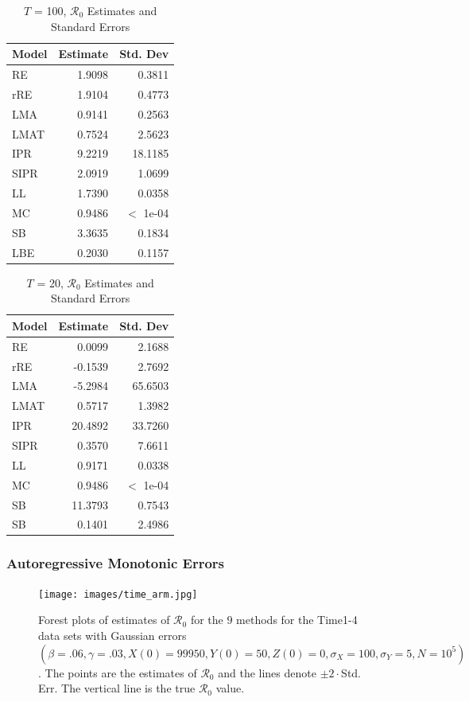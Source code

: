 \documentclass[12pt]{article}
\newcommand{\xxsir}{\ensuremath{9} } %
\newcommand{\rr}{\ensuremath{\mathcal{R}_0}}
\begin{document}
\begin{table}[H]
	
	
	\centering
	\begin{tabular}[t]{l|r|r}
		\hline
		Model & Estimate & Std. Dev\\
		\hline
		RE & 1.9098 & 0.3811\\
		\hline
		rRE & 1.9104 & 0.4773\\
		\hline
		LMA & 0.9141 & 0.2563\\
		\hline
		LMAT & 0.7524 & 2.5623\\
		\hline
		IPR & 9.2219 & 18.1185\\
		\hline
		SIPR & 2.0919 & 1.0699\\
		\hline
		LL & 1.7390 & 0.0358\\
		\hline
		MC & 0.9486 & $<$ 1e-04\\
		\hline
		SB & 3.3635 & 0.1834\\
		\hline
		LBE & 0.2030 & 0.1157\\
		\hline
	\end{tabular}
	\caption{ $T$ = 100, $\rr$ Estimates and Standard Errors}
\end{table}

\begin{table}[H]
	\centering
	\begin{tabular}[t]{l|r|r}
		\hline
		Model & Estimate & Std. Dev\\
		\hline
		RE & 0.0099 & 2.1688\\
		\hline
		rRE & -0.1539 & 2.7692\\
		\hline
		LMA & -5.2984 & 65.6503\\
		\hline
		LMAT & 0.5717 & 1.3982\\
		\hline
		IPR & 20.4892 & 33.7260\\
		\hline
		SIPR & 0.3570 & 7.6611\\
		\hline
		LL & 0.9171 & 0.0338\\
		\hline
		MC & 0.9486 & $<$ 1e-04\\
		\hline
		SB & 11.3793 & 0.7543\\
		\hline
		SB & 0.1401 & 2.4986\\
		\hline
	\end{tabular}
	\caption{$T$ = 20, $\rr$ Estimates and Standard Errors}
\end{table}

\subsubsection{Autoregressive Monotonic Errors}
\begin{figure}[H]
	\centering
	\texttt{[image: images/time\_arm.jpg]}
	\caption{Forest plots of estimates of $\rr$ for the \xxsir methods for the Time1-4 data sets with Gaussian errors $(\beta=.06, \gamma=.03, X(0)=99950, Y(0)=50, Z(0)=0, \sigma_X=100, \sigma_Y=5, N=10^5)$.  The points are the estimates of $\rr$ and the lines denote $\pm 2\cdot $Std. Err.  The vertical line is the true $\rr$ value.}
\end{figure}
\end{document}
